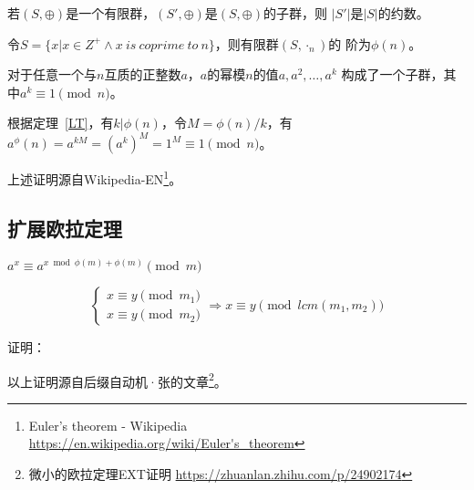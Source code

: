 \begin{theorem}\label{LT}
	若$(S,\oplus)$是一个有限群，$(S',\oplus)$是$(S,\oplus)$的子群，则
	$|S'|$是$|S|$的约数。
\end{theorem}

令$S=\{x|x\in Z^+ \land x~is~coprime~to~n\}$，则有限群$(S,\cdot_n)$的
阶为$\phi(n)$。

对于任意一个与$n$互质的正整数$a$，$a$的幂模$n$的值$a,a^2,\ldots,a^k$
构成了一个子群，其中$a^k\equiv 1 \pmod{n}$。

根据定理~\ref{LT}，有$k|\phi(n)$，令$M=\phi(n)/k$，有
$a^\phi(n)=a^{kM}=(a^k)^M=1^M\equiv 1 \pmod{n}$。

上述证明源自Wikipedia-EN\footnote{Euler's theorem - Wikipedia
	\url{https://en.wikipedia.org/wiki/Euler's_theorem}}。
\subsection{扩展欧拉定理}
\begin{theorem}
	$a^x\equiv a^{x \bmod \phi(m)+\phi(m)} \pmod{m}$
\end{theorem}

\begin{lemma}
	\begin{displaymath}
		\left\{
		\begin{array}{l}
			x\equiv y \pmod{m_1} \\
			x\equiv y \pmod{m_2}
		\end{array}
		\right.
		\Rightarrow x\equiv y \pmod{lcm(m_1,m_2)}
	\end{displaymath}
\end{lemma}

证明：


以上证明源自后缀自动机·张的文章\footnote{微小的欧拉定理EXT证明
	\url{https://zhuanlan.zhihu.com/p/24902174}}。
